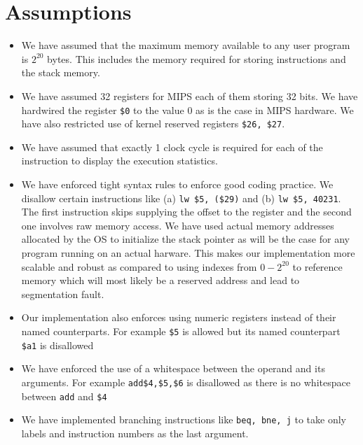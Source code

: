 \documentclass[hidelinks,12pt]{article}
\begin{document}
\section{Assumptions}
\begin{itemize}
    \item We have assumed that the maximum memory available to any user program is $2^{20}$ bytes. This includes the memory required for storing instructions and the stack memory.
    \item We have assumed 32 registers for MIPS each of them storing 32 bits. We have hardwired the register \verb|$0| to the value $0$ as is the case in MIPS hardware. We have also restricted use of kernel reserved registers \verb|$26, $27|.
    \item We have assumed that exactly 1 clock cycle is required for each of the instruction to display the execution statistics.
    \item We have enforced tight syntax rules to enforce good coding practice. We disallow certain instructions like (a) \verb|lw $5, ($29)| and (b) \verb|lw $5, 40231|.
          The first instruction skips supplying the offset to the register and the second one involves raw memory access. We have used actual memory addresses allocated by the OS to initialize the stack pointer as will be the case for any program running on an actual harware.
          This makes our implementation more scalable and robust as compared to using indexes from $0 - 2^{20}$ to reference memory which will most likely be a reserved address and lead to segmentation fault.
    \item Our implementation also enforces using numeric registers instead of their named counterparts. For example \verb|$5| is allowed but its named counterpart \verb|$a1| is disallowed
    \item We have enforced the use of a whitespace between the operand and its arguments. For example \verb|add$4,$5,$6| is disallowed as there is no whitespace between \verb|add| and \verb|$4|
    \item We have implemented branching instructions like \verb|beq, bne, j| to take only labels and instruction numbers as the last argument.
\end{itemize}
\end{document}
